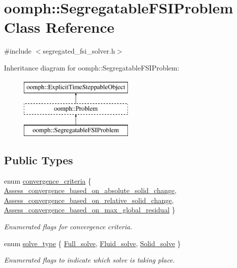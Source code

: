 \hypertarget{classoomph_1_1SegregatableFSIProblem}{}\section{oomph\+:\+:Segregatable\+F\+S\+I\+Problem Class Reference}
\label{classoomph_1_1SegregatableFSIProblem}


{\ttfamily \#include $<$segregated\+\_\+fsi\+\_\+solver.\+h$>$}

Inheritance diagram for oomph\+:\+:Segregatable\+F\+S\+I\+Problem\+:\begin{figure}[H]
\begin{center}
\leavevmode
\includegraphics[height=3.000000cm]{classoomph_1_1SegregatableFSIProblem}
\end{center}
\end{figure}
\subsection*{Public Types}
\begin{DoxyCompactItemize}
\item 
enum \hyperlink{classoomph_1_1SegregatableFSIProblem_a06634a6823bb5062d11e97f0be78f373}{convergence\+\_\+criteria} \{ \hyperlink{classoomph_1_1SegregatableFSIProblem_a06634a6823bb5062d11e97f0be78f373a96434fdb328f1440d763eb901f0e1dcc}{Assess\+\_\+convergence\+\_\+based\+\_\+on\+\_\+absolute\+\_\+solid\+\_\+change}, 
\hyperlink{classoomph_1_1SegregatableFSIProblem_a06634a6823bb5062d11e97f0be78f373a735439a264d7a63a310e12f384d5a081}{Assess\+\_\+convergence\+\_\+based\+\_\+on\+\_\+relative\+\_\+solid\+\_\+change}, 
\hyperlink{classoomph_1_1SegregatableFSIProblem_a06634a6823bb5062d11e97f0be78f373aaf32b15e9b1cc097ef3acff8a196bbbd}{Assess\+\_\+convergence\+\_\+based\+\_\+on\+\_\+max\+\_\+global\+\_\+residual}
 \}\begin{DoxyCompactList}\small\item\em Enumerated flags for convergence criteria. \end{DoxyCompactList}
\item 
enum \hyperlink{classoomph_1_1SegregatableFSIProblem_a263f8553427533dc831bd420b8fbf418}{solve\+\_\+type} \{ \hyperlink{classoomph_1_1SegregatableFSIProblem_a263f8553427533dc831bd420b8fbf418a0a2ec06d36907f018f82176e8256e76d}{Full\+\_\+solve}, 
\hyperlink{classoomph_1_1SegregatableFSIProblem_a263f8553427533dc831bd420b8fbf418ab5a200f3f251db5b62d69b7d80b98dae}{Fluid\+\_\+solve}, 
\hyperlink{classoomph_1_1SegregatableFSIProblem_a263f8553427533dc831bd420b8fbf418adb1f2e7a1cc45691468c5a5663ada4ca}{Solid\+\_\+solve}
 \}\begin{DoxyCompactList}\small\item\em Enumerated flags to indicate which solve is taking place. \end{DoxyCompactList}
\end{DoxyCompactItemize}
